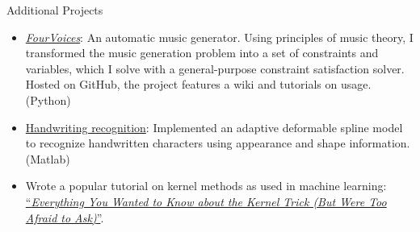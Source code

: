 \documentclass{resume}
\begin{document}
\begin{component}{Additional Projects}
	\begin{itemize}
		\vspace{-0.5em}\item \href{https://github.com/erickim555/FourVoices}{\emph{FourVoices}}: An automatic music generator.
Using principles of music theory, I transformed the music generation problem into a set of constraints and variables, which I solve with a general-purpose constraint satisfaction solver.
Hosted on GitHub, the project features a wiki and tutorials on usage.
		(Python)
        \vspace{-0.5em}\item \href{http://eric-kim.net/cs269\_fa2014/index.html}{Handwriting recognition}:
        Implemented an adaptive deformable spline model to recognize handwritten characters using appearance and shape information.
(Matlab)
            \vspace{-0.5em}\item Wrote a popular tutorial on kernel methods as used in machine learning: \href{http://eric-kim.net/eric-kim-net/posts/1/kernel\_trick\_blog\_ekim\_12\_20\_2017.pdf}{``\emph{Everything You Wanted to Know about the Kernel Trick (But Were Too Afraid to Ask)}''}.
	\end{itemize}
\end{component}
\end{document}
